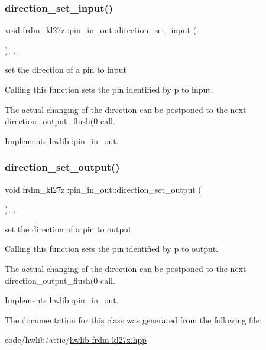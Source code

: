 \subsubsection{\texorpdfstring{direction\+\_\+set\+\_\+input()}{direction\_set\_input()}}
{\footnotesize\ttfamily void frdm\+\_\+kl27z\+::pin\+\_\+in\+\_\+out\+::direction\+\_\+set\+\_\+input (\begin{DoxyParamCaption}{ }\end{DoxyParamCaption})\hspace{0.3cm}{\ttfamily [inline]}, {\ttfamily [override]}, {\ttfamily [virtual]}}

set the direction of a pin to input

Calling this function sets the pin identified by p to input.

The actual changing of the direction can be postponed to the next direction\+\_\+output\+\_\+flush(0 call. 

Implements \hyperlink{classhwlib_1_1pin__in__out_a54ce1a5086d3c9e7b868511b1d46acd0}{hwlib\+::pin\+\_\+in\+\_\+out}.

\mbox{\label{classfrdm__kl27z_1_1pin__in__out_a329bd2ea5a7fc1516ceacc8708a1226e}} 
\subsubsection{\texorpdfstring{direction\+\_\+set\+\_\+output()}{direction\_set\_output()}}
{\footnotesize\ttfamily void frdm\+\_\+kl27z\+::pin\+\_\+in\+\_\+out\+::direction\+\_\+set\+\_\+output (\begin{DoxyParamCaption}{ }\end{DoxyParamCaption})\hspace{0.3cm}{\ttfamily [inline]}, {\ttfamily [override]}, {\ttfamily [virtual]}}

set the direction of a pin to output

Calling this function sets the pin identified by p to output.

The actual changing of the direction can be postponed to the next direction\+\_\+output\+\_\+flush(0 call. 

Implements \hyperlink{classhwlib_1_1pin__in__out_ad08a5f5e9a4c3aadaa7c665b98f2418e}{hwlib\+::pin\+\_\+in\+\_\+out}.



The documentation for this class was generated from the following file\+:\begin{DoxyCompactItemize}
\item 
code/hwlib/attic/\hyperlink{hwlib-frdm-kl27z_8hpp}{hwlib-\/frdm-\/kl27z.\+hpp}\end{DoxyCompactItemize}
